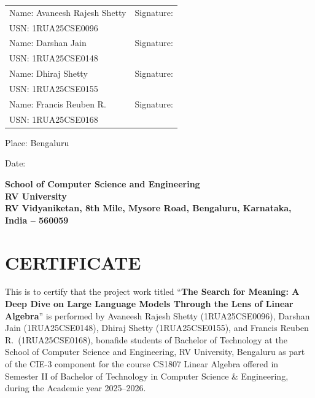 \documentclass[12pt,a4paper]{article}
\begin{document}
\begin{tabular}{ll}
Name: Avaneesh Rajesh Shetty  & Signature: \underline{\hspace{5cm}} \\
USN: 1RUA25CSE0096            & \\[0.6em]
Name: Darshan Jain            & Signature: \underline{\hspace{5cm}} \\
USN: 1RUA25CSE0148            & \\[0.6em]
Name: Dhiraj Shetty           & Signature: \underline{\hspace{5cm}} \\
USN: 1RUA25CSE0155            & \\[0.6em]
Name: Francis Reuben R.       & Signature: \underline{\hspace{5cm}} \\
USN: 1RUA25CSE0168            & \\
\end{tabular}

\vspace{1cm}

Place: Bengaluru

Date: \underline{\hspace{5cm}}

\newpage
\begin{center}
{\large\bfseries School of Computer Science and Engineering\\
RV University\\
RV Vidyaniketan, 8th Mile, Mysore Road, Bengaluru, Karnataka, India -- 560059}
\end{center}

\vspace{1cm}

\section*{CERTIFICATE}

This is to certify that the project work titled ``\textbf{The Search for Meaning: A Deep Dive on
Large Language Models Through the Lens of Linear Algebra}'' is performed by Avaneesh Rajesh Shetty
(1RUA25CSE0096), Darshan Jain (1RUA25CSE0148), Dhiraj Shetty (1RUA25CSE0155), and Francis Reuben
R.\ (1RUA25CSE0168), bonafide students of Bachelor of Technology at the School of Computer Science
and Engineering, RV University, Bengaluru as part of the CIE-3 component for the course CS1807
Linear Algebra offered in Semester II of Bachelor of Technology in Computer Science \& Engineering,
during the Academic year 2025--2026.
\end{document}

